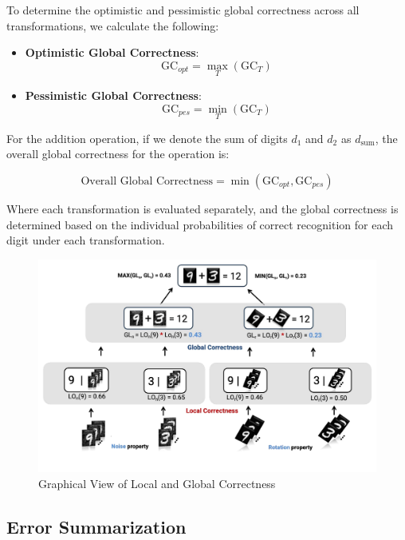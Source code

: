 \documentclass[10pt, conference, a4paper, final]{IEEEtran}
\begin{document}
    To determine the optimistic and pessimistic global correctness across all transformations, we calculate the following:
    
    \begin{itemize}
        \item \textbf{Optimistic Global Correctness}:
        \[
        \text{GC}_{opt} = \max_{T} (\text{GC}_{T})
        \]
        \item \textbf{Pessimistic Global Correctness}:
        \[
        \text{GC}_{pes} = \min_{T} (\text{GC}_{T})
        \]
    \end{itemize}
    
    For the addition operation, if we denote the sum of digits \( d_1 \) and \( d_2 \) as \( d_{\text{sum}} \), the overall global correctness for the operation is:
    
    \[
    \text{Overall Global Correctness} = \min(\text{GC}_{opt}, \text{GC}_{pes})
    \]
    
    Where each transformation is evaluated separately, and the global correctness is determined based on the individual probabilities of correct recognition for each digit under each transformation.
    \begin{figure}{}
        \centering
        \includegraphics[width=\linewidth]{paper_images/noise_rotation_localcal_global.pdf}
        \caption{Graphical View of Local and Global Correctness}
        \label{fig:graph}
    \end{figure}

 
   
\subsection{Error Summarization}
\end{document}
